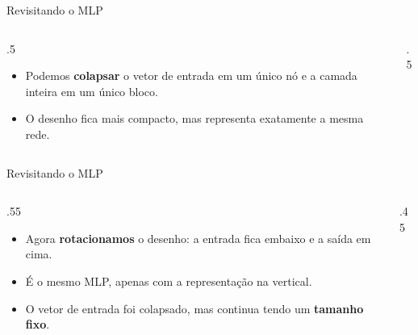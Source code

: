 \documentclass[aspectratio=169,xcolor=dvipsnames]{beamer}
\begin{document}
\begin{frame}{Revisitando o MLP}
\begin{columns}
    \begin{column}{.5\linewidth}
        \begin{itemize}
            \item Podemos \textbf{colapsar} o vetor de entrada em um único nó e a camada inteira em um único bloco.
            \item O desenho fica mais compacto, mas representa exatamente a mesma rede.
        \end{itemize}
    \end{column}
    \begin{column}{.5\linewidth}
        \centering
    \end{column}
\end{columns}
\end{frame}

\begin{frame}{Revisitando o MLP}
\begin{columns}
    \begin{column}{.55\linewidth}
        \begin{itemize}
            \item Agora \textbf{rotacionamos} o desenho: a entrada fica embaixo e a saída em cima.
            \item É o mesmo MLP, apenas com a representação na vertical.
            \item O vetor de entrada foi colapsado, mas continua tendo um \textbf{tamanho fixo}.
        \end{itemize}
    \end{column}
    \begin{column}{.45\linewidth}
        \centering
    \end{column}
\end{columns}
\end{frame}
\end{document}
